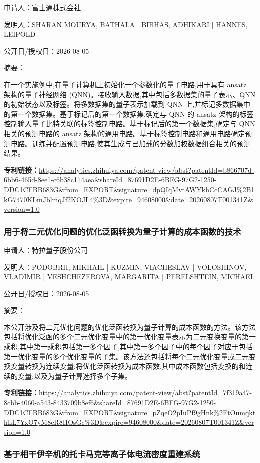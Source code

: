 \documentclass[12pt,a4paper]{ctexart}
\begin{document}
申请人：富士通株式会社

发明人：SHARAN MOURYA, BATHALA | BIBHAS, ADHIKARI | HANNES, LEIPOLD

公开日/授权日：2026-08-05

摘要：

在一个实施例中,在量子计算机上初始化一个参数化的量子电路,用于具有 ansatz 架构的量子神经网络 (QNN)。接收输入数据,其中包括多数据集的量子表示、QNN 的初始状态以及标签。将多数据集的量子表示加载到 QNN 上,并标记多数据集中的第一个数据集。基于标记后的第一个数据集,确定与 QNN 的 ansatz 架构的标签控制输入量子比特关联的标签控制电路。基于标记后的第一个数据集,确定与 QNN 相关的预测电路的 ansatz 架构的通用电路。基于标签控制电路和通用电路确定预测电路。训练并配置预测电路,使其生成与已加载的分数加权数据组合相关的预测结果。

\noindent\textbf{专利链接：}\url{https://analytics.zhihuiya.com/patent-view/abst?patentId=b866707d-6bb6-465d-8ee1-c6b38c114aea&shareId=87691D2E-6BFG-97G2-1250-DDC1CFBB683G&from=EXPORT&signature=dpQIqMvtAWYkhCcCAGJ%2B1kG7470KLmJblmqJf2KOJL4%3D&expire=94608000&date=20260807T001341Z&version=1.0}

\subsubsection{ 用于将二元优化问题的优化泛函转换为量子计算的成本函数的技术 }

申请人：特拉量子股份公司

发明人：PODOBRII, MIKHAIL | KUZMIN, VIACHESLAV | VOLOSHINOV, VLADIMIR | VESHCHEZEROVA, MARGARITA | PERELSHTEIN, MICHAEL

公开日/授权日：2026-08-05

摘要：

本公开涉及将二元优化问题的优化泛函转换为量子计算的成本函数的方法。该方法包括将优化泛函的多个二元优化变量中的第一优化变量表示为二元变换变量的第一乘积,其中第一乘积包括第一多个因子,其中第一多个因子中的每个因子对应于包括第一优化变量的多个优化变量的子集。该方法还包括将每个二元优化变量或二元变换变量转换为连续变量;将优化泛函转换为成本函数,其中成本函数包括变换的和连续的变量;以及为量子计算选择多个子集。

\noindent\textbf{专利链接：}\url{https://analytics.zhihuiya.com/patent-view/abst?patentId=7f319a47-8cbb-4060-a543-8433709b8ef6&shareId=87691D2E-6BFG-97G2-1250-DDC1CFBB683G&from=EXPORT&signature=pZqeO2pIuPf9gHnk%2FtOumqkthLL7YxO7yM8cR8HOsGc%3D&expire=94608000&date=20260807T001341Z&version=1.0}

\subsubsection{ 基于相干伊辛机的托卡马克等离子体电流密度重建系统 }
\end{document}
